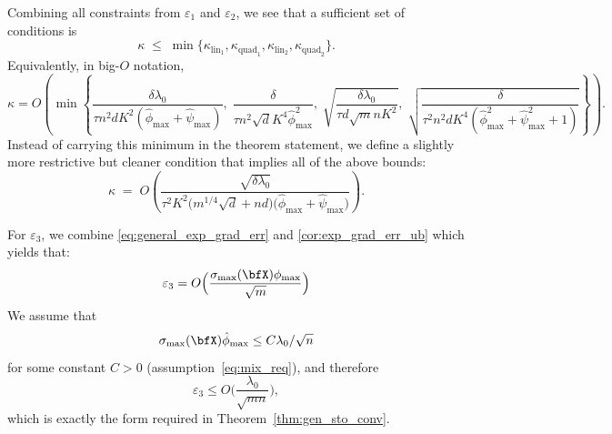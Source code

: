 \documentclass[10pt]{article} %
\theoremstyle{definition}
\theoremstyle{plain}
\begin{document}
Combining all constraints from $\varepsilon_1$
and $\varepsilon_2$, we see that a sufficient set of conditions is
\[
\kappa
\;\le\;
\min\bigl\{
\kappa_{\mathrm{lin}_1},
\kappa_{\mathrm{quad}_1},
\kappa_{\mathrm{lin}_2},
\kappa_{\mathrm{quad}_2}
\bigr\}.
\]
Equivalently, in big-$O$ notation,
\begin{equation}
\label{eq:kappa_min_bigO}
\kappa
=
O\!\left(
\min\left\{
\frac{\delta\lambda_0}{\tau n^2 d K^2(\hat\phi_{\max}+\hat\psi_{\max})},
\;
\frac{\delta}{\tau n^2 \sqrt{d} K^4 \hat\phi_{\max}^2},
\;
\sqrt{\frac{\delta\lambda_0}{\tau d\sqrt{m} nK^2}},
\;
\sqrt{\frac{\delta}{\tau^2 n^2 d K^4(\hat\phi_{\max}^2+\hat\psi_{\max}^2+1)}}
\right\}
\right).
\end{equation}
Instead of carrying this minimum in the theorem statement, we define a slightly more restrictive but cleaner condition that implies all of the above bounds: 
\begin{equation}
\label{eq:kappa_clean}
    \kappa
    \;=\;
    O\!\left(
        \frac{\sqrt{\delta\lambda_0}}
             {\tau^2 K^2\bigl(m^{1/4}\sqrt{d} + n d\bigr) \big(\hat\phi_{\max} + \hat\psi_{\max}\big)}
    \right).
\end{equation}

For $\varepsilon_3$, we combine \eqref{eq:general_exp_grad_err} and \eqref{cor:exp_grad_err_ub} which yields that:
\[
\varepsilon_3
=
O\Big(\frac{\sigma_{\max}(\bfX)\phi_{\max}}{\sqrt{m}}\Big)
\]
We assume that 
\[
\sigma_{\max}(\bfX)\hat\phi_{\max}\le C \lambda_0/\sqrt{n}
\]
for some constant $C>0$ (assumption~\eqref{eq:mix_req}), and therefore
\begin{equation}
\varepsilon_3
 \le 
O\Big(\frac{\lambda_0}{\sqrt{mn}}\Big),
\label{eq:eps3_scaling}
\end{equation}
which is exactly the form required in Theorem~\ref{thm:gen_sto_conv}.
\end{document}
